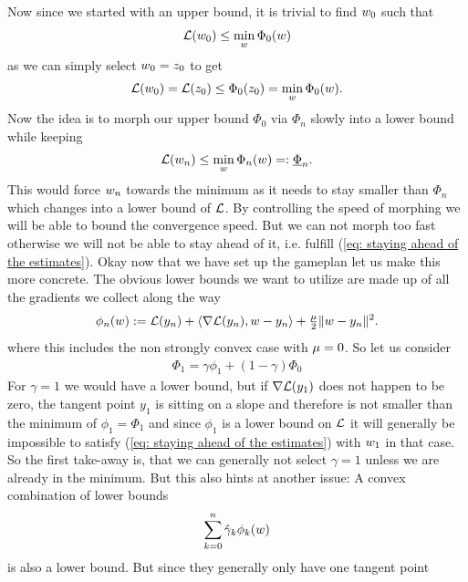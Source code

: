 Now since we started with an upper bound, it is trivial to find \(w_0\)
such that
\begin{align*}
	\mathcal{L}(w_0) \le \min_{w}\Phi_0(w)
\end{align*}
as we can simply select \(w_0=z_0\) to get
\begin{align*}
	\mathcal{L}(w_0) =\mathcal{L}(z_0) \le \Phi_0(z_0) = \min_{w}\Phi_0(w).
\end{align*}
Now the idea is to morph our upper bound \(\Phi_0\) via \(\Phi_n\) slowly into
a lower bound while keeping 
\begin{align}\label{eq: staying ahead of the estimates}
	\mathcal{L}(w_n) \le \min_{w}\Phi_n(w)=:\underline{\Phi}_n.
\end{align}
This would force \(w_n\) towards the minimum as it needs to stay smaller
than \(\Phi_n\) which changes into a lower bound of \(\mathcal{L}\). By controlling
the speed of morphing we will be able to bound the convergence speed. But we
can not morph too fast otherwise we will not be able to stay ahead of it, i.e.
fulfill (\ref{eq: staying ahead of the estimates}). Okay now that we have set
up the gameplan let us make this more concrete.
The obvious lower bounds we want to utilize are made up of all the gradients we
collect along the way
\begin{align*}
	\phi_n(w)
	:= \mathcal{L}(y_n) + \langle\nabla\mathcal{L}(y_n), w-y_n\rangle
	+ \tfrac{\mu}{2}\|w-y_n\|^2.
\end{align*}
where this includes the non strongly convex case with \(\mu=0\). So let
us consider
\begin{align*}
	\Phi_1 = \gamma \phi_1 + (1-\gamma)\Phi_0
\end{align*}
For \(\gamma=1\) we would have a lower bound, but if \(\nabla\mathcal{L}(y_1)\)
does not happen to be zero, the tangent point \(y_1\) is sitting on a slope and
therefore is not smaller than the minimum of \(\phi_1=\Phi_1\) and since \(\phi_1\)
is a lower bound on \(\mathcal{L}\) it will generally be impossible to satisfy
(\ref{eq: staying ahead of the estimates}) with \(w_1\) in that case.
So the first take-away is, that we can generally not select \(\gamma=1\)
unless we are already in the minimum. But this also hints at another issue:
A convex combination of lower bounds
\begin{align*}
	\sum_{k=0}^n \hat{\gamma}_k \phi_k(w)
\end{align*}
is also a lower bound. But since they generally only have one tangent point
